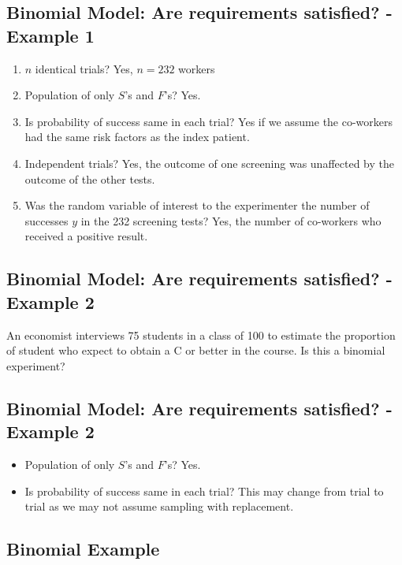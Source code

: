 \documentclass[
  letterpaper,
  DIV=11,
  numbers=noendperiod]{scrartcl}
\begin{document}
\subsection{Binomial Model: Are requirements satisfied? - Example
1}\label{binomial-model-are-requirements-satisfied---example-1-1}

\begin{enumerate}
\def\labelenumi{\arabic{enumi}.}
\item
  \(n\) identical trials? Yes, \(n=232\) workers
\item
  Population of only \(S\)'s and \(F\)'s? Yes.
\item
  Is probability of success same in each trial? Yes if we assume the
  co-workers had the same risk factors as the index patient.
\item
  Independent trials? Yes, the outcome of one screening was unaffected
  by the outcome of the other tests.
\item
  Was the random variable of interest to the experimenter the number of
  successes \(y\) in the 232 screening tests? Yes, the number of
  co-workers who received a positive result.
\end{enumerate}

\subsection{Binomial Model: Are requirements satisfied? - Example
2}\label{binomial-model-are-requirements-satisfied---example-2}

An economist interviews 75 students in a class of 100 to estimate the
proportion of student who expect to obtain a C or better in the course.
Is this a binomial experiment?

\subsection{Binomial Model: Are requirements satisfied? - Example
2}\label{binomial-model-are-requirements-satisfied---example-2-1}

\begin{itemize}
\item
  Population of only \(S\)'s and \(F\)'s? Yes.
\item
  Is probability of success same in each trial? This may change from
  trial to trial as we may not assume sampling with replacement.
\end{itemize}

\subsection{Binomial Example}\label{binomial-example}
\end{document}
